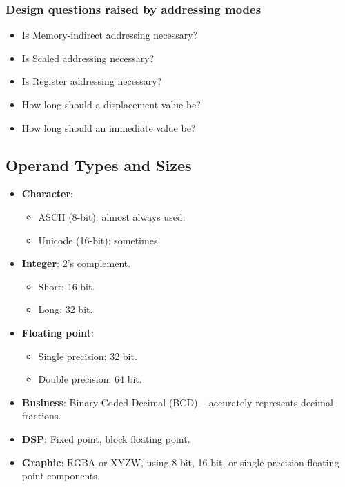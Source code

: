 \subsubsection{Design questions raised by addressing modes}

\begin{itemize}
  \item Is Memory-indirect addressing necessary?
  \item Is Scaled addressing necessary?
  \item Is Register addressing necessary?
  \item How long should a displacement value be?
  \item How long should an immediate value be?
\end{itemize}

\subsection{Operand Types and Sizes}

\begin{itemize}
  \item \textbf{Character}:
  \begin{itemize}
    \item ASCII (8-bit): almost always used.
    \item Unicode (16-bit): sometimes.
  \end{itemize}
  \item \textbf{Integer}: 2's complement.
  \begin{itemize}
    \item Short: 16 bit.
    \item Long: 32 bit.
  \end{itemize}
  \item \textbf{Floating point}:
  \begin{itemize}
    \item Single precision: 32 bit.
    \item Double precision: 64 bit.
  \end{itemize}
  \item \textbf{Business}: Binary Coded Decimal (BCD) -- accurately
  represents decimal fractions.
  \item \textbf{DSP}: Fixed point, block floating point.
  \item \textbf{Graphic}: RGBA or XYZW, using 8-bit, 16-bit, or single
  precision floating point components.
\end{itemize}

